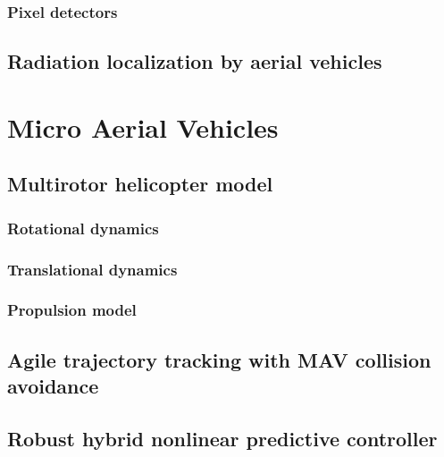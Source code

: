 \documentclass[a4paper,11pt,titlepage,twoside]{book}
\begin{document}
\subsection{Pixel detectors}

\section{Radiation localization by aerial vehicles}



\chapter{Micro Aerial Vehicles}


\section{Multirotor helicopter model}

\subsection{Rotational dynamics}

\subsection{Translational dynamics}

\subsection{Propulsion model}

\section{Agile trajectory tracking with MAV collision avoidance}

\section{Robust hybrid nonlinear predictive controller}
\end{document}
